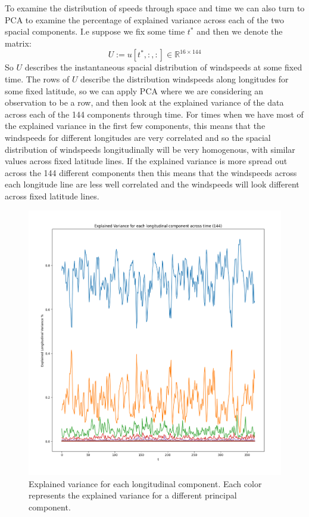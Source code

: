 \documentclass[a4paper, oneside]{book}
\begin{document}
To examine the distribution of speeds through space and time we can also turn to PCA
to examine the percentage of explained variance across each of the two spacial components. I.e suppose we fix some time $t^*$ and then we denote the matrix:
$$
U := u[t^*, :, :] \in \mathbb{R}^{16 \times 144}
$$
So $U$ describes the instantaneous spacial distribution of windspeeds at some fixed time.
The rows of $U$ describe the distribution windspeeds along longitudes for some fixed latitude,
so we can apply PCA where we are considering an observation to be a row, and then
look at the explained variance of the data across each of the 144 components through time.
For times when we have most of the explained variance in the first few components, this
means that the windspeeds for different longitudes are very correlated and so the spacial distribution of windspeeds longitudinally will be very homogenous, with similar values
across fixed latitude lines. If the explained variance is more spread out across
the 144 different components then this means that the windspeeds across each
longitude line are less well correlated and the windspeeds will look different
across fixed latitude lines.

\begin{figure}[htpb]
    \centering
    \includegraphics[width=1.0\textwidth]{./images/Pasted image 20231205164825.png}
    \caption{Explained variance for each longitudinal component. Each color represents
    the explained variance for a different principal component.}
\end{figure}
\end{document}
